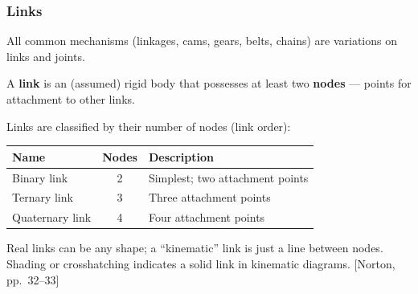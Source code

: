\documentclass[10pt,aspectratio=43]{beamer}
\newcommand{\pref}[1]{\vfill\hfill{\scriptsize\color{gray}[Norton, pp.~#1]}}
\begin{document}
\begin{frame}
\frametitle{Links}

All common mechanisms (linkages, cams, gears, belts, chains) are variations on links and joints.

\vspace{6pt}
\begin{yellowbox}
A \textbf{link} is an (assumed) rigid body that possesses at least two \textbf{nodes} --- points for attachment to other links.
\end{yellowbox}

\vspace{6pt}
Links are classified by their number of nodes (link order):

\begin{center}
\begin{tabular}{lcl}
\toprule
\textbf{Name} & \textbf{Nodes} & \textbf{Description} \\
\midrule
Binary link & 2 & Simplest; two attachment points \\
Ternary link & 3 & Three attachment points \\
Quaternary link & 4 & Four attachment points \\
\bottomrule
\end{tabular}
\end{center}

\vspace{4pt}
Real links can be any shape; a ``kinematic'' link is just a line between nodes. Shading or crosshatching indicates a solid link in kinematic diagrams.
\pref{32--33}
\end{frame}
\end{document}
